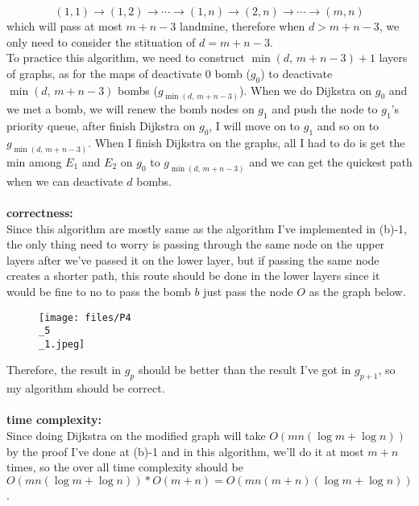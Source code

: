 \documentclass{homework}
\begin{document}
\begin{itemize}
    \[(1,1) \rightarrow (1,2) \rightarrow\cdots\rightarrow (1,n) \rightarrow (2,n) \rightarrow\cdots\rightarrow (m,n)\]
    which will pass at most $m + n - 3$ landmine, therefore when $d > m+n-3$, we only need to consider the stituation of $d=m+n-3$.\\
    To practice this algorithm, we need to construct $\min(d,\,m+n-3)+1$ layers of graphs, as for the maps of deactivate $0$ bomb ($g_0$) to deactivate $\min(d,\,m+n-3)$ bombs ($g_{\min(d,\,m+n-3)}$). When we do Dijkstra on $g_0$ and we met a bomb, we will renew the bomb nodes on $g_1$ and push the node to $g_1$'s priority queue, after finish Dijkstra on $g_0$, I will move on to $g_1$ and so on to $g_{\min(d,\,m+n-3)}$. When I finish Dijkstra on the graphs, all I had to do is get the min among $E_1$ and $E_2$ on $g_0$ to $g_{\min(d,\,m+n-3)}$ and we can get the quickest path when we can deactivate $d$ bombs.\\\\
    \textbf{correctness: }\\
    Since this algorithm are mostly same as the algorithm I've implemented in (b)-1, the only thing need to worry is passing through the same node on the upper layers after we've passed it on the lower layer, but if passing the same node creates a shorter path, this route should be done in the lower layers since it would be fine to no to pass the bomb $b$ just pass the node $O$ as the graph below.\\
    \begin{figure}[H]
        \centering
        \texttt{[image: files/P4\\\_5\\\_1.jpeg]}
    \end{figure}
    Therefore, the result in $g_p$ should be better than the result I've got in $g_{p+1}$, so my algorithm should be correct.\\\\
    \textbf{time complexity:}\\
    Since doing Dijkstra on the modified graph will take $O(mn(\log m+\log n))$ by the proof I've done at (b)-1 and in this algorithm, we'll do it at most $m+n$ times, so the over all time complexity should be $O(mn(\log m+\log n)) * O(m+n) = O(mn(m+n)(\log m+\log n))$.\\
\clearpage
\end{itemize}
\end{document}
